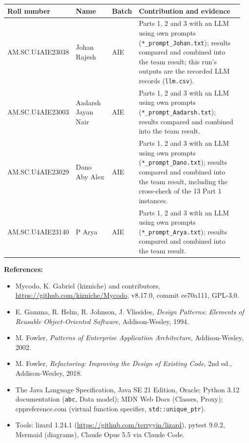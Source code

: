 \documentclass[11pt,a4paper]{article}
\begin{document}
{\small\setlength{\tabcolsep}{3pt}
\begin{longtable}{@{}P{0.19\linewidth}P{0.17\linewidth}P{0.08\linewidth}P{0.52\linewidth}@{}}\toprule
\textbf{Roll number} & \textbf{Name} & \textbf{Batch} & \textbf{Contribution and evidence} \\ \midrule\endhead
AM.SC.U4AIE23038 & Johan Rajesh & AIE & Parts 1, 2 and 3 with an LLM using own prompts (\texttt{*\_\allowbreak{}prompt\_\allowbreak{}Johan.\allowbreak{}txt}); results compared and combined into the team result; this run's outputs are the recorded LLM records (\texttt{llm.\allowbreak{}csv}). \\
AM.SC.U4AIE23003 & Aadarsh Jayan Nair & AIE & Parts 1, 2 and 3 with an LLM using own prompts (\texttt{*\_\allowbreak{}prompt\_\allowbreak{}Aadarsh.\allowbreak{}txt}); results compared and combined into the team result. \\
AM.SC.U4AIE23029 & Dano Aby Alex & AIE & Parts 1, 2 and 3 with an LLM using own prompts (\texttt{*\_\allowbreak{}prompt\_\allowbreak{}Dano.\allowbreak{}txt}); results compared and combined into the team result, including the cross-check of the 13 Part 1 instances. \\
AM.SC.U4AIE23140 & P Arya & AIE & Parts 1, 2 and 3 with an LLM using own prompts (\texttt{*\_\allowbreak{}prompt\_\allowbreak{}Arya.\allowbreak{}txt}); results compared and combined into the team result. \\
\bottomrule\end{longtable}}
\textbf{References:}\par
\begin{itemize}
\item Mycodo, K. Gabriel (kizniche) and contributors, \url{https://github.com/kizniche/Mycodo}, v8.17.0, commit ee70a111, GPL-3.0.
\item E. Gamma, R. Helm, R. Johnson, J. Vlissides, \emph{Design Patterns: Elements of Reusable Object-Oriented Software}, Addison-Wesley, 1994.
\item M. Fowler, \emph{Patterns of Enterprise Application Architecture}, Addison-Wesley, 2002.
\item M. Fowler, \emph{Refactoring: Improving the Design of Existing Code}, 2nd ed., Addison-Wesley, 2018.
\item The Java Language Specification, Java SE 21 Edition, Oracle; Python 3.12 documentation (\texttt{abc}, Data model); MDN Web Docs (Classes, Proxy); cppreference.com (virtual function specifier, \texttt{std::unique\_\allowbreak{}ptr}).
\item Tools: lizard 1.24.1 (\url{https://github.com/terryyin/lizard}), pytest 9.0.2, Mermaid (diagrams), Claude Opus 5.5 via Claude Code.
\end{itemize}
\end{document}
